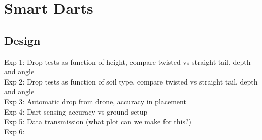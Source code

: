 \section{Smart Darts}\label{sec:SmartDarts}

\subsection{Design}
Exp 1: Drop tests as function of height, compare twisted vs straight tail, depth and angle\\
Exp 2: Drop tests as function of soil type, compare twisted vs straight tail, depth and angle\\
Exp 3: Automatic drop from drone, accuracy in placement\\
Exp 4: Dart sensing accuracy vs ground setup\\
Exp 5: Data transmission (what plot can we make for this?)\\
Exp 6: 